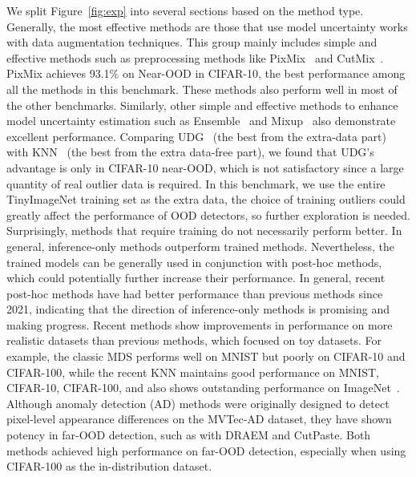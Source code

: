 We split Figure~\ref{fig:exp} into several sections based on the method type. Generally, the most effective methods are those that use model uncertainty works with data augmentation techniques. This group mainly includes simple and effective methods such as preprocessing methods like PixMix~ and CutMix~. PixMix achieves 93.1\% on Near-OOD in CIFAR-10, the best performance among all the methods in this benchmark. These methods also perform well in most of the other benchmarks. Similarly, other simple and effective methods to enhance model uncertainty estimation such as Ensemble~ and Mixup~ also demonstrate excellent performance.
Comparing UDG~ (the best from the extra-data part) with KNN~ (the best from the extra data-free part), we found that UDG's advantage is only in CIFAR-10 near-OOD, which is not satisfactory since a large quantity of real outlier data is required. In this benchmark, we use the entire TinyImageNet training set as the extra data, the choice of training outliers could greatly affect the performance of OOD detectors, so further exploration is needed.
Surprisingly, methods that require training do not necessarily perform better. In general, inference-only methods outperform trained methods. Nevertheless, the trained models can be generally used in conjunction with post-hoc methods, which could potentially further increase their performance.
In general, recent post-hoc methods have had better performance than previous methods since 2021, indicating that the direction of inference-only methods is promising and making progress. Recent methods show improvements in performance on more realistic datasets than previous methods, which focused on toy datasets. For example, the classic MDS performs well on MNIST but poorly on CIFAR-10 and CIFAR-100, while the recent KNN maintains good performance on MNIST, CIFAR-10, CIFAR-100, and also shows outstanding performance on ImageNet~.
Although anomaly detection (AD) methods were originally designed to detect pixel-level appearance differences on the MVTec-AD dataset, they have shown potency in far-OOD detection, such as with DRAEM and CutPaste. Both methods achieved high performance on far-OOD detection, especially when using CIFAR-100 as the in-distribution dataset.

